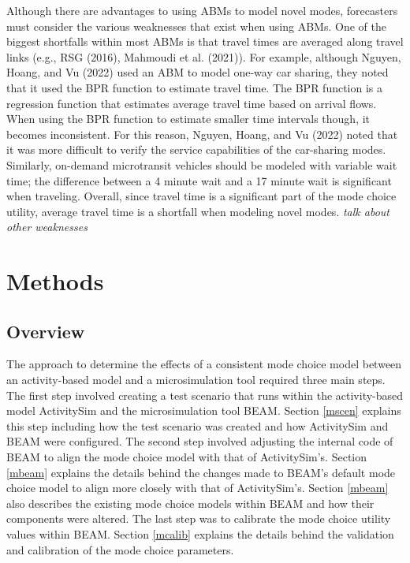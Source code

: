 \documentclass[12pt, oneside, openright]{byuthesis}
\begin{document}
Although there are advantages to using ABMs to model novel modes, forecasters must consider the various weaknesses that exist when using ABMs. One of the biggest shortfalls within most ABMs is that travel times are averaged along travel links (e.g., RSG (2016), Mahmoudi et al. (2021)). For example, although Nguyen, Hoang, and Vu (2022) used an ABM to model one-way car sharing, they noted that it used the BPR function to estimate travel time. The BPR function is a regression function that estimates average travel time based on arrival flows. When using the BPR function to estimate smaller time intervals though, it becomes inconsistent. For this reason, Nguyen, Hoang, and Vu (2022) noted that it was more difficult to verify the service capabilities of the car-sharing modes. Similarly, on-demand microtransit vehicles should be modeled with variable wait time; the difference between a 4 minute wait and a 17 minute wait is significant when traveling. Overall, since travel time is a significant part of the mode choice utility, average travel time is a shortfall when modeling novel modes. \emph{talk about other weaknesses}

\hypertarget{methods}{%
\chapter{Methods}\label{methods}}

\hypertarget{overview}{%
\section{Overview}\label{overview}}

The approach to determine the effects of a consistent mode choice model between an activity-based model and a microsimulation tool required three main steps. The first step involved creating a test scenario that runs within the activity-based model ActivitySim and the microsimulation tool BEAM. Section \ref{mscen} explains this step including how the test scenario was created and how ActivitySim and BEAM were configured. The second step involved adjusting the internal code of BEAM to align the mode choice model with that of ActivitySim's. Section \ref{mbeam} explains the details behind the changes made to BEAM's default mode choice model to align more closely with that of ActivitySim's. Section \ref{mbeam} also describes the existing mode choice models within BEAM and how their components were altered. The last step was to calibrate the mode choice utility values within BEAM. Section \ref{mcalib} explains the details behind the validation and calibration of the mode choice parameters.
\end{document}
